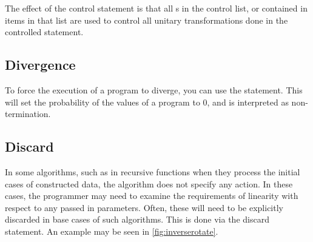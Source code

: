 The effect of the control statement is that all \qubit{}s in the 
control list, or contained in items
in that list are used to control all unitary 
transformations done in the controlled
statement.

\subsection{Divergence}\label{subsec:nontermination}
To force the execution  of a program  to diverge, you can use the
 statement. This will set the probability of the values of
a program to 0, and is interpreted as non-termination.

\subsection{Discard}\label{subsec:discard}
In some algorithms, such as  in recursive functions when they process
the initial cases of constructed data,
the algorithm does not specify any action. In these cases, the programmer
may need to examine the requirements of linearity with respect to 
any passed in parameters. Often, these will need to be explicitly
discarded in base cases of such algorithms.
This is done via the discard statement.
An example may be seen in \vref{fig:inverserotate}.
